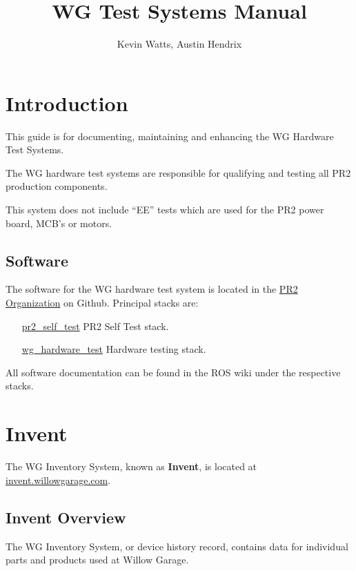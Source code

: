 \documentclass[11pt]{report}
\begin{document}
\title{WG Test Systems Manual}
\author{Kevin Watts, Austin Hendrix}
\newcommand{\TODO}[1]{\textcolor{red}{TODO: #1}}
\maketitle

\tableofcontents
\newpage


\chapter {Introduction}

This guide is for documenting, maintaining and enhancing the WG Hardware Test Systems. 

The WG hardware test systems are responsible for qualifying and testing all PR2 production components.

This system does not include ``EE'' tests which are used for the PR2 power board, MCB's or motors.


\section {Software}

The software for the WG hardware test system is located in the \href{https://github.com/PR2}{PR2 Organization} on Github. Principal stacks are:
\begin{itemize}
\item [\href{https://github.com/PR2/pr2_self_test}{pr2\_self\_test}] PR2 Self Test stack.
\item [\href{https://github.com/willowgarage/wg_hardware_test}{wg\_hardware\_test}] Hardware testing stack.
\end{itemize}

All software documentation can be found in the ROS wiki under the respective stacks.

\chapter {Invent}

The WG Inventory System, known as {\bf Invent}, is located at \href{http://invent.willowgarage.com}{invent.willowgarage.com}. 

\section{Invent Overview}
The WG Inventory System, or device history record, contains data for individual parts and products used at Willow Garage. 
\end{document}
